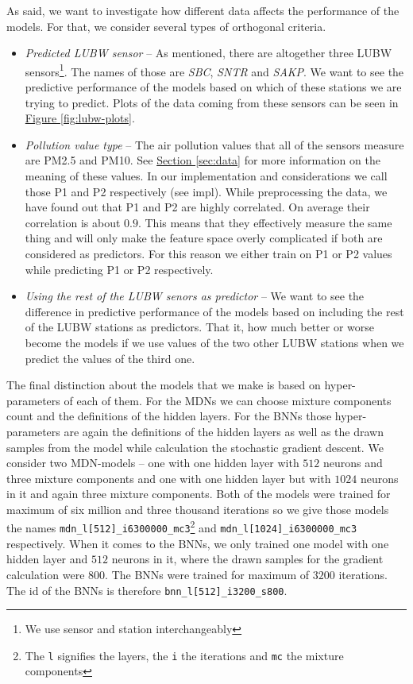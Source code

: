 \documentclass[12pt,a4paper,twoside]{scrartcl}
\numberwithin{equation}{section}
\newcommand{\reffig}[1]{\hyperref[#1]{Figure \ref*{#1}}}
\newcommand{\refsec}[1]{\hyperref[#1]{Section \ref*{#1}}}
\begin{document}
As said, we want to investigate how different data affects the performance of the models. For that, we consider several types of orthogonal criteria.
\begin{itemize}
\item \emph{Predicted LUBW sensor} -- As mentioned, there are altogether three LUBW sensors\footnote{We use sensor and station interchangeably}. The names of those are \emph{SBC}, \emph{SNTR} and \emph{SAKP}. We want to see the predictive performance of the models based on which of these stations we are trying to predict. Plots of the data coming from these sensors can be seen in \reffig{fig:lubw-plots}.
\item \emph{Pollution value type} -- The air pollution values that all of the sensors measure are PM2.5 and PM10. See \refsec{sec:data} for more information on the meaning of these values. In our implementation and considerations we call those P1 and P2 respectively (see impl). While preprocessing the data, we have found out that P1 and P2 are highly correlated. On average their correlation is about \(0.9 \). This means that they effectively measure the same thing and will only make the feature space overly complicated if both are considered as predictors. For this reason we either train on P1 or P2 values while predicting P1 or P2 respectively.
\item \emph{Using the rest of the LUBW senors as predictor} -- We want to see the difference in predictive performance of the models based on including the rest of the LUBW stations as predictors. That it, how much better or worse become the models if we use values of the two other LUBW stations when we predict the values of the third one.
\end{itemize}
The final distinction about the models that we make is based on hyper-parameters of each of them. For the MDNs we can choose mixture components count and the definitions of the hidden layers. For the BNNs those hyper-parameters are again the definitions of the hidden layers as well as the drawn samples from the model while calculation the stochastic gradient descent. We consider two MDN-models -- one with one hidden layer with \(512\) neurons and three mixture components and one with one hidden layer but with \(1024\) neurons in it and again three mixture components. Both of the models were trained for maximum of six million and three thousand iterations so we give those models the names \texttt{mdn\_l[512]\_i6300000\_mc3}\footnote{The \texttt{l} signifies the layers, the \texttt{i} the iterations and \texttt{mc} the mixture components} and \texttt{mdn\_l[1024]\_i6300000\_mc3} respectively. When it comes to the BNNs, we only trained one model with one hidden layer and \(512\) neurons in it, where the drawn samples for the gradient calculation were \(800\). The BNNs were trained for maximum of \(3200\) iterations. The id of the BNNs is therefore \texttt{bnn\_l[512]\_i3200\_s800}.
\end{document}
